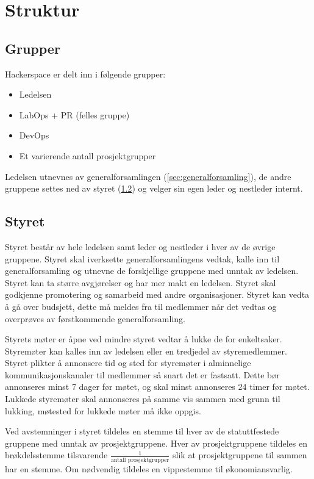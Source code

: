 \section{Struktur}\label{sec:struktur}
\subsection{Grupper}\label{sec:struktur:grupper}
Hackerspace er delt inn i følgende grupper:
\begin{itemize}
\item Ledelsen
\item LabOps + PR (felles gruppe)
\item DevOps
\item Et varierende antall prosjektgrupper
\end{itemize}
Ledelsen utnevnes av generalforsamlingen (\ref{sec:generalforsamling}),  de andre gruppene settes ned av styret (\ref{sec:struktur:styret}) og velger sin egen leder og nestleder internt.

\subsection{Styret}\label{sec:struktur:styret}
Styret består av hele ledelsen samt leder og nestleder i hver av de øvrige gruppene.
Styret skal iverksette generalforsamlingens vedtak, kalle inn til generalforsamling og utnevne de forskjellige gruppene med unntak av ledelsen.
Styret kan ta større avgjørelser og har mer makt en ledelsen.
Styret skal godkjenne promotering og samarbeid med andre organisasjoner.
Styret kan vedta å gå over budsjett, dette må meldes fra til medlemmer når det vedtas og overprøves av førstkommende generalforsamling.

Styrets møter er åpne ved mindre styret vedtar å lukke de for enkeltsaker.
Styremøter kan kalles inn av ledelsen eller en tredjedel av styremedlemmer.
Styret plikter å annonsere tid og sted for styremøter i alminnelige kommunikasjonskanaler til medlemmer så snart det er fastsatt.
Dette bør annonseres minst 7 dager før møtet, og skal minst annonseres 24 timer før møtet.
Lukkede styremøter skal annonseres på samme vis sammen med grunn til lukking, møtested for lukkede møter må ikke oppgis.

Ved avstemninger i styret tildeles en stemme til hver av de statuttfestede gruppene med unntak av prosjektgruppene.
Hver av prosjektgruppene tildeles en brøkdelsstemme tilsvarende $\frac{1}{\text{antall prosjektgrupper}}$ slik at prosjektgruppene til sammen har en stemme.
Om nødvendig tildeles en vippestemme til økonomiansvarlig.

